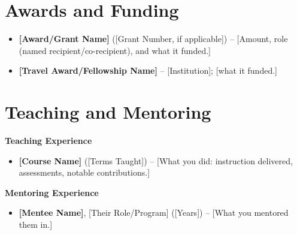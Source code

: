 \documentclass[11pt,letterpaper,sans]{moderncv}
\begin{document}

\section{Awards and Funding}
\vspace{1pt}
\begin{itemize}
\item{\textbf{[Award/Grant Name]} ([Grant Number, if applicable]) -- [Amount, role (named recipient/co-recipient), and what it funded.]}
\item{\textbf{[Travel Award/Fellowship Name]} -- [Institution]; [what it funded.]}
\end{itemize}


\section{Teaching and Mentoring}
\vspace{1pt}
\textbf{Teaching Experience}
\vspace{1pt}
\begin{itemize}
\item{\textbf{[Course Name]} ([Terms Taught]) -- [What you did: instruction delivered, assessments, notable contributions.]}
\end{itemize}

\vspace{3pt}
\textbf{Mentoring Experience}
\vspace{1pt}
\begin{itemize}
\item{\textbf{[Mentee Name]}, [Their Role/Program] ([Years]) -- [What you mentored them in.]}
\end{itemize}


\end{document}

